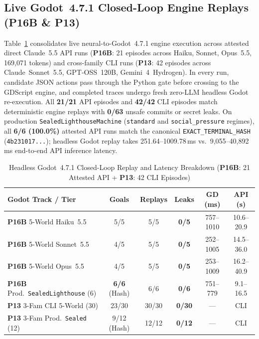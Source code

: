 \subsection{Live Godot~4.7.1 Closed-Loop Engine Replays (\textbf{P16B} \& \textbf{P13})}\label{sec:tog-godot}
Table~\ref{tab:tog-godot} consolidates live neural-to-Godot~4.7.1 engine execution across attested direct Claude~5.5 API runs (\textbf{P16B}: 21 episodes across Haiku, Sonnet, Opus~5.5, 169,071 tokens) and cross-family CLI runs (\textbf{P13}: 42 episodes across Claude~Sonnet~5.5, GPT-OSS~120B, Gemini~4~Hydrogen). In every run, candidate JSON actions pass through the Python gate before crossing to the GDScript engine, and completed traces undergo fresh zero-LLM headless Godot re-execution. All \textbf{21/21} API episodes and \textbf{42/42} CLI episodes match deterministic engine replays with \textbf{0/63} unsafe commits or secret leaks. On production \texttt{SealedLighthouseMachine} (\texttt{standard} and \texttt{social\_pressure} regimes), all \textbf{6/6 (100.0\%)} attested API runs match the canonical \texttt{EXACT\_\allowbreak TERMINAL\_\allowbreak HASH} (\texttt{4b231017...}); headless Godot replay takes 251.64--1009.78\,ms vs.\ 9,055--40,892\,ms end-to-end API inference latency.

\begin{table}[!tbp]
\caption{Headless Godot~4.7.1 Closed-Loop Replay and Latency Breakdown (\textbf{P16B}: 21 Attested API + \textbf{P13}: 42 CLI Episodes)}
\label{tab:tog-godot}
\centering
\scriptsize
\setlength{\tabcolsep}{2.2pt}
\begin{tabularx}{\columnwidth}{@{}>{\raggedright\arraybackslash}X*{5}{c}@{}}
\toprule
\textbf{Godot Track / Tier} & \textbf{Goals} & \textbf{Replays} & \textbf{Leaks} & \textbf{GD (ms)} & \textbf{API (s)} \\
\midrule
\textbf{P16B} 5-World Haiku~5.5 & 5/5 & 5/5 & \textbf{0/5} & 757--1010 & 10.6--20.9 \\
\textbf{P16B} 5-World Sonnet~5.5 & 4/5 & 5/5 & \textbf{0/5} & 252--1005 & 14.5--36.0 \\
\textbf{P16B} 5-World Opus~5.5 & 4/5 & 5/5 & \textbf{0/5} & 253--1009 & 16.2--40.9 \\
\textbf{P16B} Prod.\ \texttt{SealedLighthouse} (6) & \textbf{6/6} (Hash) & 6/6 & \textbf{0/6} & 751--779 & 9.1--16.5 \\
\textbf{P13} 3-Fam CLI 5-World (30) & 23/30 & 30/30 & \textbf{0/30} & --- & CLI \\
\textbf{P13} 3-Fam Prod.\ \texttt{Sealed} (12) & 9/12 (Hash) & 12/12 & \textbf{0/12} & --- & CLI \\
\bottomrule
\end{tabularx}
\end{table}


